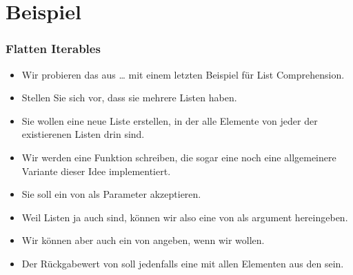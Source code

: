 \documentclass[aspectratio=169,mathserif,notheorems]{beamer}%
\begin{document}
\section{Beispiel}%
%
\begin{frame}%
\frametitle{Flatten Iterables}%
\begin{itemize}%
\item Wir probieren das aus {\dots} mit einem letzten Beispiel für List Comprehension.%
%
\item<2-> Stellen Sie sich vor, dass sie mehrere Listen haben.%
%
\item<3-> Sie wollen eine neue Liste erstellen, in der alle Elemente von jeder der existierenen Listen drin sind.%
%
\item<4-> Wir werden eine Funktion  schreiben, die sogar eine noch eine allgemeinere Variante dieser Idee implementiert.%
%
\item<5-> Sie soll ein  von  als Parameter akzeptieren.%
%
\item<6-> Weil Listen ja auch  sind, können wir also eine  von  als argument hereingeben.%
%
\item<7-> Wir können aber auch ein  von  angeben, wenn wir wollen.%
%
\item<8-> Der Rückgabewert von  soll jedenfalls eine  mit allen Elementen aus den   sein.%
\end{itemize}%
\end{frame}%
%
\end{document}
